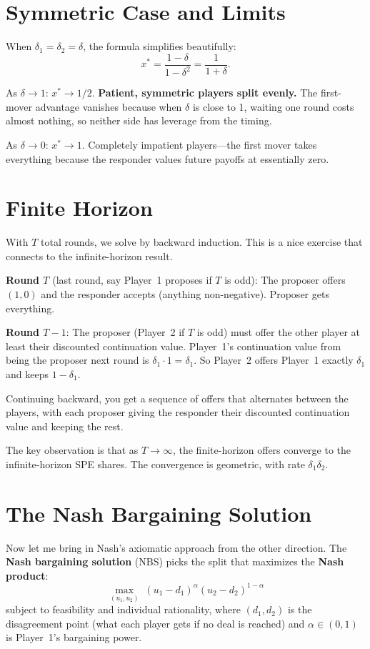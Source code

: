 \documentclass[11pt]{article}
\begin{document}
\section{Symmetric Case and Limits}

When $\delta_1 = \delta_2 = \delta$, the formula simplifies beautifully:
\[
x^* = \frac{1 - \delta}{1 - \delta^2} = \frac{1}{1 + \delta}.
\]

As $\delta \to 1$: $x^* \to 1/2$. \textbf{Patient, symmetric players split evenly.} The first-mover advantage vanishes because when $\delta$ is close to 1, waiting one round costs almost nothing, so neither side has leverage from the timing.

As $\delta \to 0$: $x^* \to 1$. Completely impatient players---the first mover takes everything because the responder values future payoffs at essentially zero.

\section{Finite Horizon}

With $T$ total rounds, we solve by backward induction. This is a nice exercise that connects to the infinite-horizon result.

\textbf{Round $T$} (last round, say Player~1 proposes if $T$ is odd): The proposer offers $(1, 0)$ and the responder accepts (anything non-negative). Proposer gets everything.

\textbf{Round $T-1$}: The proposer (Player~2 if $T$ is odd) must offer the other player at least their discounted continuation value. Player~1's continuation value from being the proposer next round is $\delta_1 \cdot 1 = \delta_1$. So Player~2 offers Player~1 exactly $\delta_1$ and keeps $1 - \delta_1$.

Continuing backward, you get a sequence of offers that alternates between the players, with each proposer giving the responder their discounted continuation value and keeping the rest.

The key observation is that as $T \to \infty$, the finite-horizon offers converge to the infinite-horizon SPE shares. The convergence is geometric, with rate $\delta_1 \delta_2$.

\section{The Nash Bargaining Solution}

Now let me bring in Nash's axiomatic approach from the other direction. The \textbf{Nash bargaining solution} (NBS) picks the split that maximizes the \textbf{Nash product}:
\[
\max_{(u_1, u_2)} \; (u_1 - d_1)^\alpha (u_2 - d_2)^{1-\alpha}
\]
subject to feasibility and individual rationality, where $(d_1, d_2)$ is the disagreement point (what each player gets if no deal is reached) and $\alpha \in (0,1)$ is Player~1's bargaining power.
\end{document}
